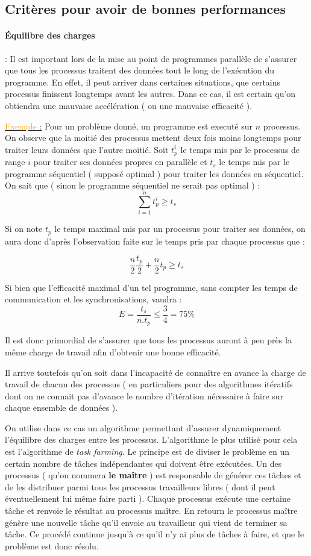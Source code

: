 \documentclass[fleqn,11pt]{article}
\begin{document}
\subsection{Critères pour avoir de bonnes performances}

\paragraph{\'Equilibre des charges} : Il est important lors de la mise au point de programmes parallèle de s'assurer que tous les processus traitent
des données tout le long de l'exécution du programme. En effet, il peut arriver dans certaines situations, que certains processus finissent
longtemps avant les autres. Dans ce cas, il est certain qu'on obtiendra une mauvaise accélération ( ou une mauvaise efficacité ).

\underline{\textcolor{orange}{Exemple} :} Pour un problème donné, un programme est executé sur $n$ processus. On observe que la moitié des processus
mettent deux fois moins longtemps pour traiter leurs données que l'autre moitié. Soit $t_{p}^{i}$ le temps mis par le processus de range $i$ pour traiter ses données
propres  en parallèle et $t_{s}$ le temps mis par le programme séquentiel ( supposé optimal ) pour traiter les données en séquentiel.
On sait que ( sinon le programme séquentiel ne serait pas optimal ) :
\[
 \sum_{i=1}^{n} t_{p}^{i} \geq t_{s}
\]

Si on note $t_{p}$ le temps maximal mis par un processus pour traiter ses données, on aura donc d'après l'observation faite sur le temps pris par chaque processus que :

\[
 \frac{n}{2}\frac{t_{p}}{2} + \frac{n}{2}t_{p} \geq t_{s}
\]

Si bien que l'efficacité maximal d'un tel programme, sans compter les temps de communication et les synchronisations,  vaudra :
\[
 E =  \frac{t_{s}}{n.t_{p}} \leq \frac{3}{4} = 75 \%
\]

Il est donc primordial de s'assurer que tous les processus auront à peu près la même charge de travail afin d'obtenir une bonne efficacité.

Il arrive toutefois qu'on soit dans l'incapacité de connaître en avance la charge de travail de chacun des processus ( en particuliers pour des
algorithmes itératifs dont on ne connait pas d'avance le nombre d'itération nécessaire à faire sur chaque ensemble de données ).

On utilise dans ce cas un algorithme permettant d'assurer dynamiquement l'équilibre des charges entre les processus. L'algorithme le plus utilisé
pour cela est l'algorithme de \textsl{task farming}. Le principe est de diviser le problème en un certain nombre de tâches indépendantes
qui doivent être exécutées. Un des processus ( qu'on nommera \textbf{le maître} ) est responsable de générer ces tâches et de les distribuer
parmi tous les processus travailleurs libres ( dont il peut éventuellement lui même faire parti ). Chaque processus exécute une certaine tâche et renvoie
le résultat au processus maître. En retourn le processus maître génère une nouvelle tâche qu'il envoie au travailleur qui vient de terminer
sa tâche. Ce procédé continue jusqu'à ce qu'il n'y ai plus de tâches à faire, et que le problème est donc résolu.
\end{document}
